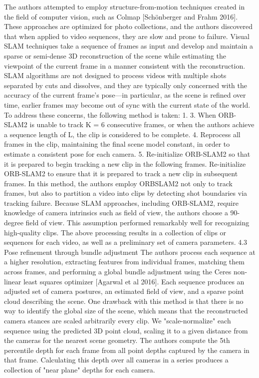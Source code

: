 The authors attempted to employ structure-from-motion techniques created in the field of computer vision, such as Colmap [Schönberger and Frahm 2016].
These approaches are optimized for photo collections, and the authors discovered that when applied to video sequences, they are slow and prone to failure.
Visual SLAM techniques take a sequence of frames as input and develop and maintain a sparse or semi-dense 3D reconstruction of the scene while estimating the viewpoint of the current frame in a manner consistent with the reconstruction.
SLAM algorithms are not designed to process videos with multiple shots separated by cuts and dissolves, and they are typically only concerned with the accuracy of the current frame's pose—in particular, as the scene is refined over time, earlier frames may become out of sync with the current state of the world.
To address these concerns, the following method is taken: 1. 3. When ORB-SLAM2 is unable to track K = 6 consecutive frames, or when the authors achieve a sequence length of L, the clip is considered to be complete.
4. Reprocess all frames in the clip, maintaining the final scene model constant, in order to estimate a consistent pose for each camera.
5. Re-initialize ORB-SLAM2 so that it is prepared to begin tracking a new clip in the following frames.
Re-initialize ORB-SLAM2 to ensure that it is prepared to track a new clip in subsequent frames.
In this method, the authors employ ORBSLAM2 not only to track frames, but also to partition a video into clips by detecting shot boundaries via tracking failure.
Because SLAM approaches, including ORB-SLAM2, require knowledge of camera intrinsics such as field of view, the authors choose a 90-degree field of view.
This assumption performed remarkably well for recognizing high-quality clips.
The above processing results in a collection of clips or sequences for each video, as well as a preliminary set of camera parameters.
4.3 Pose refinement through bundle adjustment The authors process each sequence at a higher resolution, extracting features from individual frames, matching them across frames, and performing a global bundle adjustment using the Ceres non-linear least squares optimizer [Agarwal et al 2016].
Each sequence produces an adjusted set of camera postures, an estimated field of view, and a sparse point cloud describing the scene.
One drawback with this method is that there is no way to identify the global size of the scene, which means that the reconstructed camera stances are scaled arbitrarily every clip.
We "scale-normalize" each sequence using the predicted 3D point cloud, scaling it to a given distance from the cameras for the nearest scene geometry.
The authors compute the 5th percentile depth for each frame from all point depths captured by the camera in that frame.
Calculating this depth over all cameras in a series produces a collection of "near plane" depths for each camera.


